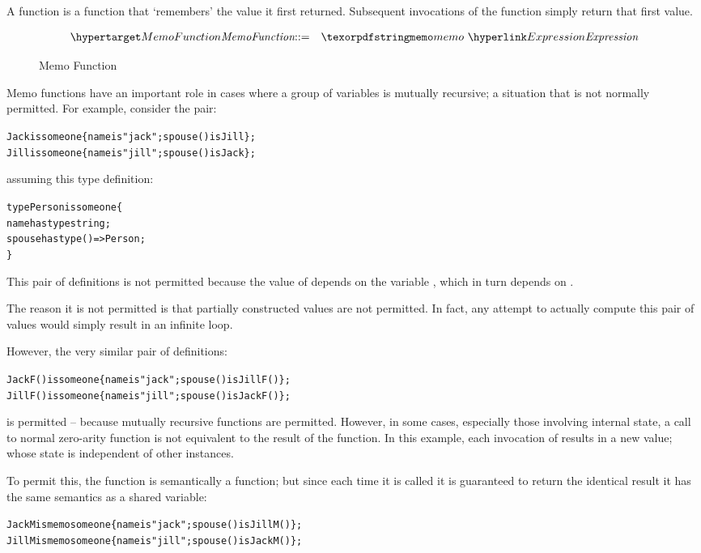 A  function is a function that `remembers' the value it first returned. Subsequent invocations of the function simply return that first value.

\begin{figure}[htbp]
\begin{eqnarray*}
\ntDef{MemoFunction}&\arrow&\q{memo}\ \ntRef{Expression}
\end{eqnarray*}
\caption{Memo Function}
\label{memoFunctionFig}
\end{figure}

Memo functions have an important role in cases where a group of variables is mutually recursive; a situation that is not normally permitted. For example, consider the pair:
\begin{alltt}
Jack is someone\{ name is "jack"; spouse() is Jill \};
Jill is someone\{ name is "jill"; spouse() is Jack \};
\end{alltt}
assuming this type definition:
\begin{alltt}
type Person is someone\{
  name has type string;
  spouse has type ()=>Person;
\}
\end{alltt}

This pair of definitions is not permitted because the value of  depends on the variable , which in turn depends on .
\begin{aside}
The reason it is not permitted is that partially constructed values are not permitted. In fact, any attempt to actually compute this pair of values would simply result in an infinite loop.
\end{aside}

However, the very similar pair of definitions:
\begin{alltt}
JackF() is someone\{ name is "jack"; spouse() is JillF() \};
JillF() is someone\{ name is "jill"; spouse() is JackF() \};
\end{alltt}
is permitted -- because mutually recursive functions are permitted. However, in some cases, especially those involving internal state, a call to normal zero-arity function is not equivalent to the result of the function. In this example, each invocation of  results in a new value; whose state is independent of other instances.

To permit this, the  function is semantically a function; but since each time it is called it is guaranteed to return the identical result it has the same semantics as a shared variable:
\begin{alltt}
JackM is memo someone\{ name is "jack"; spouse() is JillM() \};
JillM is memo someone\{ name is "jill"; spouse() is JackM() \};
\end{alltt}

